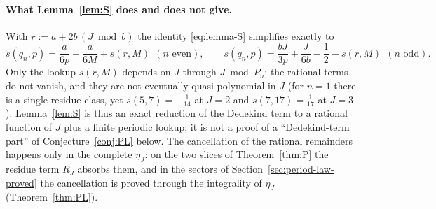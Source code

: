 \documentclass[11pt]{article}
\theoremstyle{definition}
\begin{document}
\paragraph{What Lemma~\ref{lem:S} does and does not give.}
With $r:=a+2b\,(J\bmod b)$ the identity \eqref{eq:lemma-S} simplifies
exactly to
\begin{equation}
 s(q_n,p)=\frac a{6p}-\frac a{6M}+s(r,M)\ \ (n\text{ even}),\qquad
 s(q_n,p)=\frac{bJ}{3p}+\frac J{6b}-\frac12-s(r,M)\ \ (n\text{ odd}).
 \label{eq:lemma-S-explicit}
\end{equation}
Only the lookup $s(r,M)$ depends on $J$ through $J\bmod P_n$; the
rational terms do not vanish, and they are not eventually
quasi-polynomial in $J$ (for $n=1$ there is a single residue class, yet
$s(5,7)=-\tfrac1{14}$ at $J=2$ and $s(7,17)=\tfrac1{17}$ at $J=3$).
Lemma~\ref{lem:S} is thus an exact reduction of the Dedekind term to a
rational function of $J$ plus a finite periodic lookup; it is not a
proof of a ``Dedekind-term part'' of Conjecture~\ref{conj:PL} below.
The cancellation of the rational remainders happens only in the
complete $\eta_J$: on the two slices of Theorem~\ref{thm:P} the residue
term $R_J$ absorbs them, and in the sectors of
Section~\ref{sec:period-law-proved} the cancellation is proved through
the integrality of $\eta_J$ (Theorem~\ref{thm:PL}).
\end{document}
